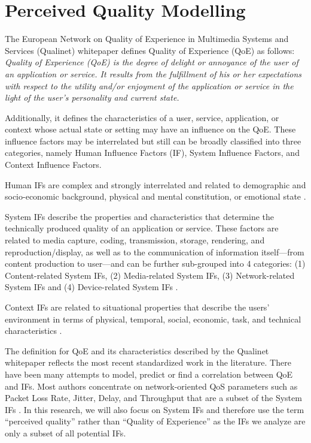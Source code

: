 \documentclass[journal]{IEEEtran}
\begin{document}
\vspace{-0.4cm}
\section{Perceived Quality Modelling}
\label{sec:quality}

The European Network on Quality of Experience in Multimedia Systems and Services (Qualinet) whitepaper \cite{le2012qualinet} defines Quality of Experience (QoE) as follows:
\textit{Quality of Experience (QoE) is the degree of delight or annoyance of the user of an application or service. It results from the fulfillment of his or her expectations with respect to the utility and/or enjoyment of the application or service in the light of the user’s personality and current state.}

Additionally, it defines the characteristics of a user, service, application, or context whose actual state or setting may have an influence on the QoE. These influence factors may be interrelated but still can be broadly classified into three categories, namely Human Influence Factors (IF), System Influence Factors, and Context Influence Factors.

Human IFs are complex and strongly interrelated and related to demographic and socio-economic background, physical and mental constitution, or emotional state \cite{le2012qualinet}.

System IFs describe the properties and characteristics that determine the technically produced quality of an application or service. These factors are related to media capture, coding, transmission, storage, rendering, and reproduction/display, as well as to the communication of information itself—from content production to user—and can be further sub-grouped into 4 categories: (1) Content-related System IFs, (2) Media-related System IFs, (3) Network-related System IFs and (4) Device-related System IFs \cite{le2012qualinet}.

Context IFs are related to situational properties that describe the users' environment in terms of physical, temporal, social, economic, task, and technical characteristics \cite{le2012qualinet}.

The definition for QoE and its characteristics described by the Qualinet whitepaper reflects the most recent standardized work in the literature. There have been many attempts to model, predict or find a correlation between QoE and IFs. Most authors concentrate on network-oriented QoS parameters such as Packet Loss Rate, Jitter, Delay, and Throughput that are a subset of the System IFs \cite{maia2014concise} \cite{paudyal2014study}. In this research, we will also focus on System IFs and therefore use the term ``perceived quality'' rather than ``Quality of Experience'' as the IFs we analyze are only a subset of all potential IFs.
\end{document}
